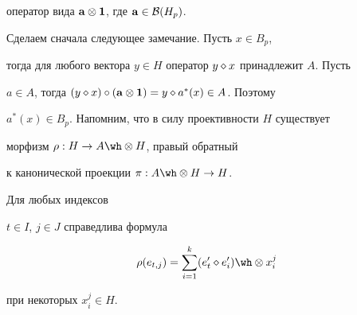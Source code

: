 оператор вида $\bold a \ten \ed$, где $\bold a


\in {\cal B}(H_p)$.





Сделаем сначала следующее замечание. Пусть $x \in B_p$,


тогда для любого вектора $y \in H$ оператор $y \diamond x$ принадлежит $A$. Пусть


$a \in A$, тогда $(y \dia x) \circ (\bold a \ten \ed) =y \dia a^*(x)


\in A$. Поэтому


$a^*(x) \in B_p$. Напомним, что в силу проективности $H$ существует


морфизм $\rho :H \to A \tens H$, правый обратный


к канонической проекции $\pi :A \tens H \to H$.





\begin{lem}


\label{LLL}


Для любых индексов


$t \in I$, $j \in J$ справедлива формула


\begin {equation}


\label {rr}


\rho (e_{t,j})=\sumk (e'_t \dia e'_i) \tens x_i^j


\end {equation}


при некоторых $x_i^j \in H$.


\end{lem}





